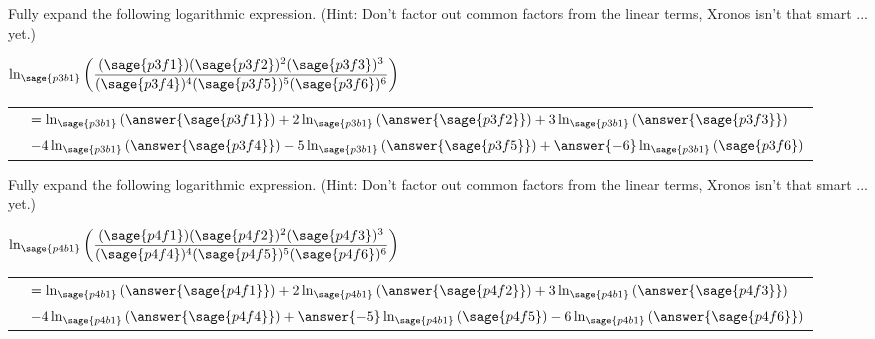 \documentclass{ximera}
\begin{document}
\begin{problem}
    Fully expand the following logarithmic expression. (Hint: Don't factor out common factors from the linear terms, Xronos isn't that smart ... yet.)
    
    $
    \logOld_{\sage{p3b1}}\left(\dfrac{(\sage{p3f1})(\sage{p3f2})^2(\sage{p3f3})^3}{(\sage{p3f4})^4(\sage{p3f5})^5(\sage{p3f6})^6}\right)
    $
    
    \begin{tabular}{ll}
            \hspace{2cm} & $= \logOld_{\sage{p3b1}}\left(\answer{\sage{p3f1}}\right) + 2\logOld_{\sage{p3b1}}\left(\answer{\sage{p3f2}}\right) + 3\logOld_{\sage{p3b1}}\left(\answer{\sage{p3f3}}\right)$ \\ 
            & $-4\logOld_{\sage{p3b1}}\left(\answer{\sage{p3f4}}\right) - 5\logOld_{\sage{p3b1}}\left(\answer{\sage{p3f5}}\right) +\answer{-6}\logOld_{\sage{p3b1}}\left({\sage{p3f6}}\right)$
    \end{tabular}
\end{problem}


\begin{problem}
    Fully expand the following logarithmic expression. (Hint: Don't factor out common factors from the linear terms, Xronos isn't that smart ... yet.)
    
    $
    \logOld_{\sage{p4b1}}\left(\dfrac{(\sage{p4f1})(\sage{p4f2})^2(\sage{p4f3})^3}{(\sage{p4f4})^4(\sage{p4f5})^5(\sage{p4f6})^6}\right)
    $
    
    \begin{tabular}{ll}
            \hspace{2cm} & $= \logOld_{\sage{p4b1}}\left(\answer{\sage{p4f1}}\right) + 2\logOld_{\sage{p4b1}}\left(\answer{\sage{p4f2}}\right) + 3\logOld_{\sage{p4b1}}\left(\answer{\sage{p4f3}}\right)$ \\ 
            & $-4\logOld_{\sage{p4b1}}\left(\answer{\sage{p4f4}}\right) + \answer{-5}\logOld_{\sage{p4b1}}\left({\sage{p4f5}}\right) - 6\logOld_{\sage{p4b1}}\left(\answer{\sage{p4f6}}\right)$
    \end{tabular}
\end{problem}
\end{document}
